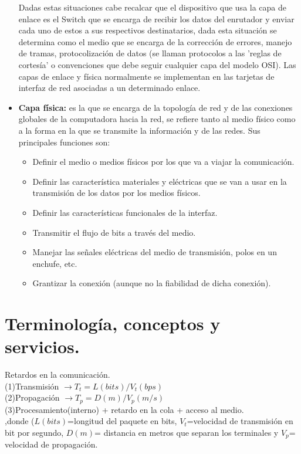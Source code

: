\documentclass[a4paper,11pt]{article}
\begin{document}
\begin{itemize}
Dadas estas situaciones cabe recalcar que el dispositivo que usa la capa de enlace es el Switch que se encarga de recibir los datos del enrutador y enviar cada uno de estos a sus respectivos destinatarios, dada esta situación se determina como el medio que se encarga de la corrección de errores, manejo de tramas, protocolización de datos (se llaman protocolos a las 'reglas de cortesía' o convenciones que debe seguir cualquier capa del modelo OSI). Las capas de enlace y física normalmente se implementan en las tarjetas de interfaz de red asociadas a un determinado enlace.

\item \textbf{Capa física:} es la que se encarga de la topología de red y de las conexiones globales de la computadora hacia la red, se refiere tanto al medio físico como a la forma en la que se transmite la información y de las redes. Sus principales funciones son:

	\begin{itemize}
		\item Definir el medio o medios físicos por los que va a viajar la comunicación.
		\item Definir las característica materiales y eléctricas que se van a usar en la transmisión de los datos por los medios físicos.
		\item Definir las características funcionales de la interfaz.
		\item Transmitir el flujo de bits a través del medio.
		\item Manejar las señales eléctricas del medio de transmisión, polos en un enchufe, etc.
		\item Grantizar la conexión (aunque no la fiabilidad de dicha conexión).
	\end{itemize}

 
\end{itemize}

\section{Terminología, conceptos y servicios.}
Retardos en la comunicación. \\
(1)Transmisión $\rightarrow T_t=L(bits)/V_t(bps)$ \\
(2)Propagación $\rightarrow T_p=D(m)/V_p(m/s)$ \\
(3)Procesamiento(interno) + retardo en la cola + acceso al medio. \\

,donde ($L(bits)$=longitud del paquete en bits, $V_t$=velocidad de transmisión en bit por segundo, $D(m)$= distancia en metros que separan los terminales y $V_p$= velocidad de propagación. \\
\end{document}
